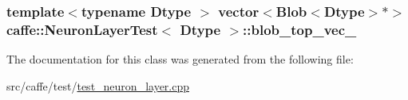 \hypertarget{classcaffe_1_1_neuron_layer_test_a3d6414a30d5c5d16c64edc9b71da81e3}{
\subsubsection[{blob\+\_\+top\+\_\+vec\+\_\+}]{\setlength{\rightskip}{0pt plus 5cm}template$<$typename Dtype $>$ vector$<${\bf Blob}$<$Dtype$>$$\ast$$>$ {\bf caffe\+::\+Neuron\+Layer\+Test}$<$ Dtype $>$\+::blob\+\_\+top\+\_\+vec\+\_\+\hspace{0.3cm}{\ttfamily [protected]}}}\label{classcaffe_1_1_neuron_layer_test_a3d6414a30d5c5d16c64edc9b71da81e3}


The documentation for this class was generated from the following file\+:\begin{DoxyCompactItemize}
\item 
src/caffe/test/\hyperlink{test__neuron__layer_8cpp}{test\+\_\+neuron\+\_\+layer.\+cpp}\end{DoxyCompactItemize}
